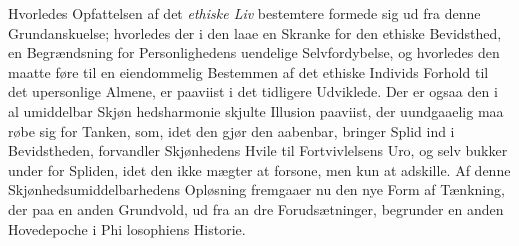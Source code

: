 Hvorledes Opfattelsen af det \emph{ethiske Liv} bestemtere
formede sig ud fra denne Grundanskuelse; hvorledes der i den
laae en Skranke for den ethiske Bevidsthed, en Begrændsning
for Personlighedens uendelige Selvfordybelse, og hvorledes den
maatte føre til en eiendommelig Bestemmen af det ethiske
Individs Forhold til det upersonlige Almene, er paaviist i det
tidligere Udviklede. Der er ogsaa den i al umiddelbar Skjøn\-%
hedsharmonie skjulte Illusion paaviist, der uundgaaelig maa
røbe sig for Tanken, som, idet den gjør den aabenbar, bringer
Splid ind i Bevidstheden, forvandler Skjønhedens Hvile til
Fortvivlelsens Uro, og selv bukker under for Spliden, idet den
ikke mægter at forsone, men kun at adskille. Af denne
Skjønhedsumiddelbarhedens Opløsning fremgaaer nu den nye
 \setcounter{footnote}{0}
Form af Tænkning, der paa en anden Grundvold, ud fra an\-%
dre Forudsætninger, begrunder en anden Hovedepoche i Phi\-%
losophiens Historie.

\divrule

